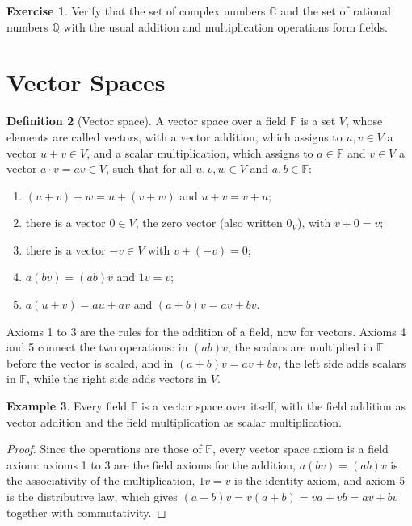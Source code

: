 \documentclass[11pt]{article}
\theoremstyle{definition}
\newtheorem{definition}{Definition}[section]
\newtheorem{example}[definition]{Example}
\newtheorem{exercise}[definition]{Exercise}
\theoremstyle{plain}
\theoremstyle{remark}
\begin{document}
\begin{exercise}
    Verify that the set of complex numbers $\mathbb{C}$ and the set of rational numbers $\mathbb{Q}$ with the usual addition and multiplication operations form fields.
\end{exercise}

\section{Vector Spaces}

\begin{definition}[Vector space]\label{def:vector-space}
    A vector space over a field $\mathbb{F}$ is a set $V$, whose elements are called vectors, with a vector addition, which assigns to $u, v \in V$ a vector $u + v \in V$, and a scalar multiplication, which assigns to $a \in \mathbb{F}$ and $v \in V$ a vector $a \cdot v = av \in V$, such that for all $u, v, w \in V$ and $a, b \in \mathbb{F}$:
    \begin{enumerate}
        \item $(u + v) + w = u + (v + w)$ and $u + v = v + u$;
        \item there is a vector $0 \in V$, the zero vector (also written $0_V$), with $v + 0 = v$;
        \item there is a vector $-v \in V$ with $v + (-v) = 0$;
        \item $a(bv) = (ab)v$ and $1v = v$;
        \item $a(u + v) = au + av$ and $(a + b)v = av + bv$.
    \end{enumerate}
\end{definition}

Axioms 1 to 3 are the rules for the addition of a field, now for vectors. Axioms 4 and 5 connect the two operations: in $(ab)v$, the scalars are multiplied in $\mathbb{F}$ before the vector is scaled, and in $(a + b)v = av + bv$, the left side adds scalars in $\mathbb{F}$, while the right side adds vectors in $V$.

\begin{example}
    Every field $\mathbb{F}$ is a vector space over itself, with the field addition as vector addition and the field multiplication as scalar multiplication.
\end{example}

\begin{proof}
    Since the operations are those of $\mathbb{F}$, every vector space axiom is a field axiom: axioms 1 to 3 are the field axioms for the addition, $a(bv) = (ab)v$ is the associativity of the multiplication, $1v = v$ is the identity axiom, and axiom 5 is the distributive law, which gives $(a + b)v = v(a + b) = va + vb = av + bv$ together with commutativity.
\end{proof}
\end{document}
